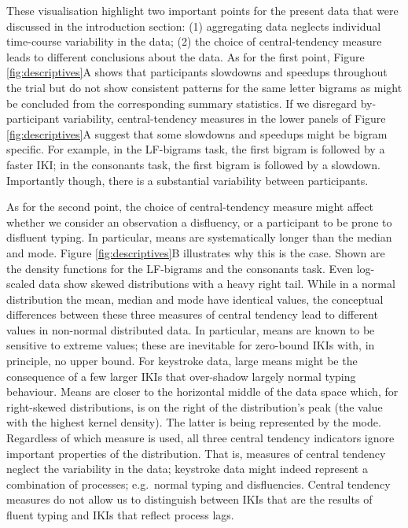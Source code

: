 \documentclass[
  english,
  man,mask,floatsintext]{apa7}
\begin{document}
These visualisation highlight two important points for the present data that were discussed in the introduction section: (1) aggregating data neglects individual time-course variability in the data; (2) the choice of central-tendency measure leads to different conclusions about the data. As for the first point, Figure \ref{fig:descriptives}A shows that participants slowdowns and speedups throughout the trial but do not show consistent patterns for the same letter bigrams as might be concluded from the corresponding summary statistics. If we disregard by-participant variability, central-tendency measures in the lower panels of Figure \ref{fig:descriptives}A suggest that some slowdowns and speedups might be bigram specific. For example, in the LF-bigrams task, the first bigram is followed by a faster IKI; in the consonants task, the first bigram is followed by a slowdown. Importantly though, there is a substantial variability between participants.

As for the second point, the choice of central-tendency measure might affect whether we consider an observation a disfluency, or a participant to be prone to disfluent typing. In particular, means are systematically longer than the median and mode. Figure \ref{fig:descriptives}B illustrates why this is the case. Shown are the density functions for the LF-bigrams and the consonants task. Even log-scaled data show skewed distributions with a heavy right tail. While in a normal distribution the mean, median and mode have identical values, the conceptual differences between these three measures of central tendency lead to different values in non-normal distributed data. In particular, means are known to be sensitive to extreme values; these are inevitable for zero-bound IKIs with, in principle, no upper bound. For keystroke data, large means might be the consequence of a few larger IKIs that over-shadow largely normal typing behaviour. Means are closer to the horizontal middle of the data space which, for right-skewed distributions, is on the right of the distribution's peak (the value with the highest kernel density). The latter is being represented by the mode. Regardless of which measure is used, all three central tendency indicators ignore important properties of the distribution. That is, measures of central tendency neglect the variability in the data; keystroke data might indeed represent a combination of processes; e.g.~normal typing and disfluencies. Central tendency measures do not allow us to distinguish between IKIs that are the results of fluent typing and IKIs that reflect process lags.
\end{document}
